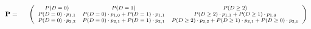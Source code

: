 \begin{displaymath}
\footnotesize
\mathbf{P} =
\begin{array}{ccc} &  
    \left( 
    \begin{array}{ccc}
        P(D=0) & P(D=1) & P(D\geq2) \\
        P(D=0)\cdot p_{1,1} & P(D=0)\cdot p_{1,0} +P(D=1)\cdot p_{1,1} & P(D\geq2)\cdot p_{1,1} +P(D\geq1)\cdot p_{1,0} \\
         P(D=0)\cdot p_{2,2} & P(D=0)\cdot p_{2,1} +P(D=1)\cdot p_{2,1} & P(D\geq2)\cdot p_{2,2} +P(D\geq1)\cdot p_{2,1}+P(D\geq0)\cdot p_{2,0} \\
    \end{array} 
    \right)  
\end{array}
\end{displaymath}